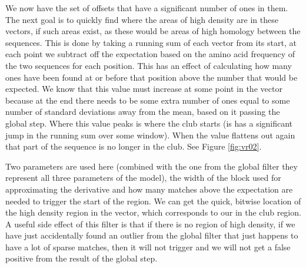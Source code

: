 \documentclass[phd,tocprelim]{cornell}
\begin{document}
We now have the set of offsets that have a significant number of ones in them. The next goal is to quickly find where the areas of high density are in these vectors, if such areas exist, as these would be areas of high homology between the sequences. This is done by taking a running sum of each vector from its start, at each point we subtract off the expectation based on the amino acid frequency of the two sequences for each position. This has an effect of calculating how many ones have been found at or before that position above the number that would be expected. We know that this value must increase at some point in the vector because at the end there needs to be some extra number of ones equal to some number of standard deviations away from the mean, based on it passing the global step. Where this value peaks is where the club starts (is has a significant jump in the running sum over some window). When the value flattens out again that part of the sequence is no longer in the club. See Figure \ref{fig:vr02}.

Two parameters are used here (combined with the one from the global filter they represent all three parameters of the model), the width of the block used for approximating the derivative and how many matches above the expectation are needed to trigger the start of the region. We can get the quick, bitwise location of the high density region in the vector, which corresponds to our in the club region. A useful side effect of this filter is that if there is no region of high density, if we have just accidentally found an outlier from the global filter that just happens to have a lot of sparse matches, then it will not trigger and we will not get a false positive from the result of the global step.
\end{document}
